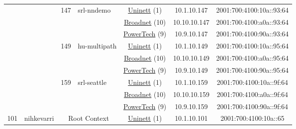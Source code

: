 \begin{small}
\begin{center}
\begin{longtable}{|c|c|c|c|c|c|c|c|}
  &  & \multirow{3}{*}{\tiny{147}} & \multicolumn{1}{|l|}{\multirow{3}{*}{\tiny{srl-nndemo}}} & \multicolumn{2}{|c|}{\tiny{\href{https://www.uninett.no}{Uninett} (1)}} & \tiny{10.1.10.147} & \tiny{2001:700:4100:10a::93:64} \\* \cline{5-5}\cline{6-6}\cline{7-7}\cline{8-8}
  &  &  &  & \multicolumn{2}{|c|}{\tiny{\href{https://www.broadnet.no}{Broadnet} (10)}} & \tiny{10.10.10.147} & \tiny{2001:700:4100:a0a::93:64} \\* \cline{5-5}\cline{6-6}\cline{7-7}\cline{8-8}
  &  &  &  & \multicolumn{2}{|c|}{\tiny{\href{http://www.powertech.no}{PowerTech} (9)}} & \tiny{10.9.10.147} & \tiny{2001:700:4100:90a::93:64} \\* \cline{3-3}\cline{4-4}\cline{5-5}\cline{6-6}\cline{7-7}\cline{8-8}
  &  & \multirow{3}{*}{\tiny{149}} & \multicolumn{1}{|l|}{\multirow{3}{*}{\tiny{hu-multipath}}} & \multicolumn{2}{|c|}{\tiny{\href{https://www.uninett.no}{Uninett} (1)}} & \tiny{10.1.10.149} & \tiny{2001:700:4100:10a::95:64} \\* \cline{5-5}\cline{6-6}\cline{7-7}\cline{8-8}
  &  &  &  & \multicolumn{2}{|c|}{\tiny{\href{https://www.broadnet.no}{Broadnet} (10)}} & \tiny{10.10.10.149} & \tiny{2001:700:4100:a0a::95:64} \\* \cline{5-5}\cline{6-6}\cline{7-7}\cline{8-8}
  &  &  &  & \multicolumn{2}{|c|}{\tiny{\href{http://www.powertech.no}{PowerTech} (9)}} & \tiny{10.9.10.149} & \tiny{2001:700:4100:90a::95:64} \\* \cline{3-3}\cline{4-4}\cline{5-5}\cline{6-6}\cline{7-7}\cline{8-8}
  &  & \multirow{3}{*}{\tiny{159}} & \multicolumn{1}{|l|}{\multirow{3}{*}{\tiny{srl-seattle}}} & \multicolumn{2}{|c|}{\tiny{\href{https://www.uninett.no}{Uninett} (1)}} & \tiny{10.1.10.159} & \tiny{2001:700:4100:10a::9f:64} \\* \cline{5-5}\cline{6-6}\cline{7-7}\cline{8-8}
  &  &  &  & \multicolumn{2}{|c|}{\tiny{\href{https://www.broadnet.no}{Broadnet} (10)}} & \tiny{10.10.10.159} & \tiny{2001:700:4100:a0a::9f:64} \\* \cline{5-5}\cline{6-6}\cline{7-7}\cline{8-8}
  &  &  &  & \multicolumn{2}{|c|}{\tiny{\href{http://www.powertech.no}{PowerTech} (9)}} & \tiny{10.9.10.159} & \tiny{2001:700:4100:90a::9f:64} \\ \hline
 \multirow{24}{*}{\tiny{101}} & \multicolumn{1}{|l|}{\multirow{24}{*}{\tiny{nihkevarri}}} & \multicolumn{2}{|c|}{\multirow{3}{*}{\tiny{Root Context}}} & \multicolumn{2}{|c|}{\tiny{\href{https://www.uninett.no}{Uninett} (1)}} & \tiny{10.1.10.101} & \tiny{2001:700:4100:10a::65} \\* \cline{5-5}\cline{6-6}\cline{7-7}\cline{8-8}

\end{longtable}
\end{center}
\end{small}
